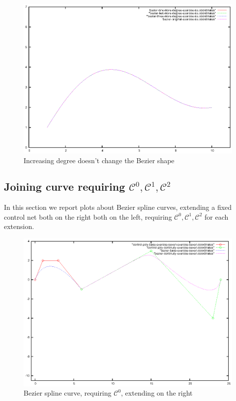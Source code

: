 \documentclass{article}
\begin{document}
\begin{figure}[h!]
  \centering
  \includegraphics{bezier-deCasteljau-curves/exercise-six-one-more-degree-comparison}
  \caption{Increasing degree doesn't change the Bezier shape}
  \label{fig:increasing-degree-does-change-curve}
\end{figure}

\subsection{Joining curve requiring $\mathcal{C}^0, \mathcal{C}^1, \mathcal{C}^2$}

In this section we report plots about Bezier spline curves, extending a fixed
control net both on the right both on the left, requiring $\mathcal{C}^0, \mathcal{C}^1, \mathcal{C}^2$
for each extension.

\begin{figure}[h!]
  \centering
  \includegraphics{bezier-deCasteljau-curves/exercise-seven-continuity}
  \caption{Bezier spline curve, requiring $\mathcal{C}^0$, extending on the right}
  \label{fig:increasing-degree-does-change-curve}
\end{figure}
\end{document}
